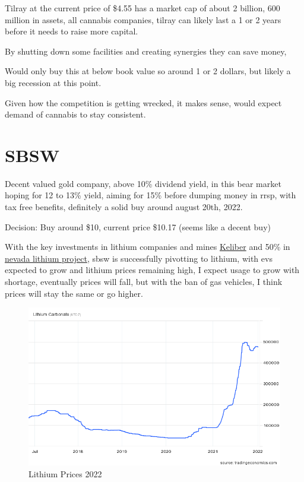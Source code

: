 Tilray at the current price of \$4.55 has a market cap of about 2 billion, 600 million in assets, all cannabis companies, tilray can likely last a 1 or 2 years before it needs to raise more capital.

By shutting down some facilities and creating synergies they can save money,

Would only buy this at below book value so around 1 or 2 dollars, but likely a big recession at this point.

Given how the competition is getting wrecked, it makes sense, would expect demand of cannabis to stay consistent.


\section{SBSW}

Decent valued gold company, above 10\% dividend yield, in this bear market hoping for 12 to 13\% yield, aiming for 15\% before dumping money in rrsp, with tax free benefits, definitely a solid buy around august 20th, 2022.

Decision: Buy around \$10, current price \$10.17 (seems like a decent buy)

With the key investments in lithium companies and mines \href{https://www.kitco.com/news/2022-06-30/Sibanye-Stillwater-to-achieve-majority-shareholding-in-lithium-developer-Keliber.html}{Keliber} and 50\% in \href{https://www.mining.com/sibanye-stillwater-grabs-50-of-nevada-lithium-project-for-490m/}{nevada lithium project}, sbsw is successfully pivotting to lithium, with evs expected to grow and lithium prices remaining high, I expect usage to grow with shortage, eventually prices will fall, but with the ban of gas vehicles, I think prices will stay the same or go higher.


\begin{figure}
\includegraphics[width=\linewidth]{src/content/images/lithium_prices_2022.png}
\caption{Lithium Prices 2022}
\end{figure}

